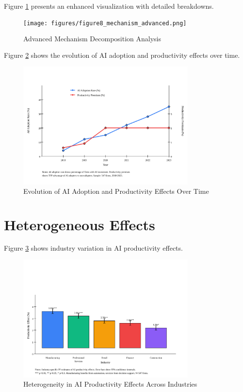 \documentclass[12pt]{article}
\begin{document}
Figure \ref{fig:mechanism_advanced} presents an enhanced visualization with detailed breakdowns.

\begin{figure}[H]
\centering
\texttt{[image: figures/figure8\_mechanism\_advanced.png]}
\caption{Advanced Mechanism Decomposition Analysis}
\label{fig:mechanism_advanced}
\end{figure}

Figure \ref{fig:time_series} shows the evolution of AI adoption and productivity effects over time.

\begin{figure}[H]
\centering
\includegraphics[width=0.8\textwidth]{figures/figure3_time_series.svg}
\caption{Evolution of AI Adoption and Productivity Effects Over Time}
\label{fig:time_series}
\end{figure}

\section{Heterogeneous Effects}

Figure \ref{fig:industry_heterogeneity} shows industry variation in AI productivity effects.

\begin{figure}[H]
\centering
\includegraphics[width=0.8\textwidth]{figures/figure4_industry_heterogeneity.svg}
\caption{Heterogeneity in AI Productivity Effects Across Industries}
\label{fig:industry_heterogeneity}
\end{figure}
\end{document}

